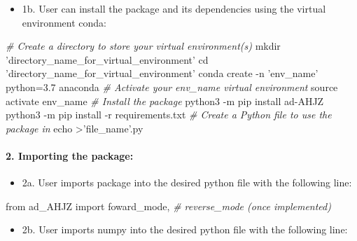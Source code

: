\documentclass[11pt]{article}
\providecommand{\tightlist}{%
      \setlength{\itemsep}{0pt}\setlength{\parskip}{0pt}}
\newenvironment{Shaded}{}{}
\newcommand{\StringTok}[1]{\textcolor[rgb]{0.25,0.44,0.63}{{#1}}}
\newcommand{\CommentTok}[1]{\textcolor[rgb]{0.38,0.63,0.69}{\textit{{#1}}}}
\newcommand{\FunctionTok}[1]{\textcolor[rgb]{0.02,0.16,0.49}{{#1}}}
\newcommand{\NormalTok}[1]{{#1}}
\newcommand{\ImportTok}[1]{{#1}}
\newcommand{\OperatorTok}[1]{\textcolor[rgb]{0.40,0.40,0.40}{{#1}}}
\newcommand{\BuiltInTok}[1]{{#1}}
\newcommand{\ExtensionTok}[1]{{#1}}
\begin{document}
\begin{itemize}
\tightlist
\item
  1b. User can install the package and its dependencies using the
  virtual environment conda:
\end{itemize}

\begin{Shaded}
\begin{Highlighting}[]
\CommentTok{# Create a directory to store your virtual environment(s)}
\FunctionTok{mkdir} \StringTok{'directory_name_for_virtual_environment'}
\BuiltInTok{cd} \StringTok{'directory_name_for_virtual_environment'}
\ExtensionTok{conda}\NormalTok{ create -n }\StringTok{'env_name'}\NormalTok{ python=3.7 anaconda}
\CommentTok{# Activate your env_name virtual environment}
\BuiltInTok{source}\NormalTok{ activate env_name}
\CommentTok{# Install the package}
\ExtensionTok{python3}\NormalTok{ -m pip install ad-AHJZ}
\ExtensionTok{python3}\NormalTok{ -m pip install -r requirements.txt}
\CommentTok{# Create a Python file to use the package in}
\BuiltInTok{echo} \OperatorTok{>}\StringTok{'file_name'}\NormalTok{.py}
\end{Highlighting}
\end{Shaded}

\hypertarget{importing-the-package}{%
\paragraph{\texorpdfstring{2. \textbf{Importing the
package:}}{2. Importing the package:}}\label{importing-the-package}}

\begin{itemize}
\tightlist
\item
  2a. User imports package into the desired python file with the
  following line:
\end{itemize}

\begin{Shaded}
\begin{Highlighting}[]
\ImportTok{from}\NormalTok{ ad_AHJZ }\ImportTok{import}\NormalTok{ foward_mode, }\CommentTok{# reverse_mode (once implemented)}
\end{Highlighting}
\end{Shaded}

\begin{itemize}
\tightlist
\item
  2b. User imports numpy into the desired python file with the following
  line:
\end{itemize}
\end{document}
